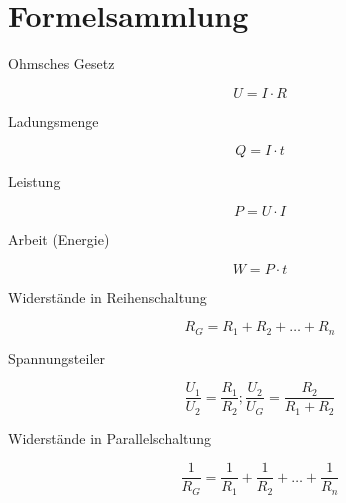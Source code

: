 \newpage
\section*{Formelsammlung}

Ohmsches Gesetz

\[
U = I \cdot R
\]

Ladungsmenge

\[
Q = I \cdot t
\]

Leistung

\[
P = U \cdot I
\]

Arbeit (Energie)

\[
W = P \cdot t
\]

Widerstände in Reihenschaltung

\[
R_G = R_1 + R_2 + \dots + R_n
\]

Spannungsteiler

\[
\frac{U_1}{U_2} = \frac{R_1}{R_2}; \frac{U_2}{U_G} = \frac{R_2}{R_1 + R_2}
\]

Widerstände in Parallelschaltung

\[
\frac{1}{R_G} = \frac{1}{R_1} + \frac{1}{R_2} + \dots + \frac{1}{R_n}
\]